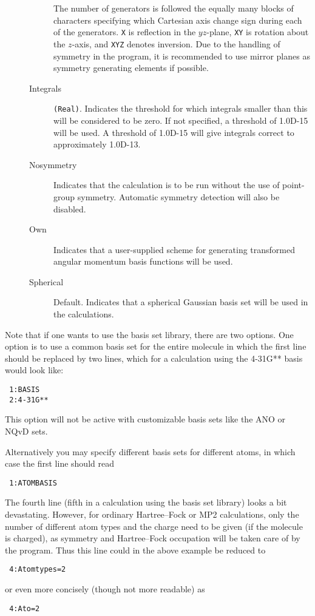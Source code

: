 \begin{description}
\begin{description}
The number of generators is followed the
equally many blocks of characters specifying which Cartesian axis
change sign during each of the generators. {\tt X}
is reflection
in the \mbox{$yz$-plane}, {\tt XY} is rotation about
the \mbox{$z$-axis},
and {\tt XYZ} denotes inversion. Due to the handling
of symmetry in
the program, it is recommended to use mirror planes as symmetry
generating elements if possible.
\item[Integrals] \verb|(Real)|. Indicates the threshold for which
  integrals smaller than this will be considered to be zero. If not
  specified, a threshold of 1.0D-15 will be used. A threshold
of 1.0D-15 will give integrals correct to approximately 1.0D-13.
\item[Nosymmetry] Indicates that the calculation is to be run without
  the use of point-group symmetry. Automatic symmetry detection will
  also be disabled.
\item[Own] Indicates that a user-supplied scheme for generating
  transformed angular momentum basis functions will be used.
\item[Spherical] Default. Indicates that a spherical Gaussian basis
  set will be used in the calculations.
\end{description}
\end{description}

Note that if one wants to use the basis set
library, there are two
options. One option is to use a common basis set for the entire
molecule in which the first line should be replaced by two lines,
which for a calculation using the 4-31G** basis would look like:
\begin{verbatim}
 1:BASIS
 2:4-31G**
\end{verbatim}
This option will not be active with customizable basis sets like the
ANO or NQvD sets.


Alternatively you may specify different basis sets for different
atoms, in which case the first line should read
\begin{verbatim}
 1:ATOMBASIS
\end{verbatim}

The fourth line (fifth in a calculation using the basis set library)
looks a bit devastating. However, for ordinary
Hartree--Fock
or MP2 calculations, only the number of different atom types and the charge
need to be given (if the molecule is charged), as symmetry and
Hartree--Fock occupation
will be taken care of by the program. Thus
this line could in the above example be reduced to
\begin{verbatim}
 4:Atomtypes=2
\end{verbatim}
or even more concisely (though not more readable) as
\begin{verbatim}
 4:Ato=2
\end{verbatim}


